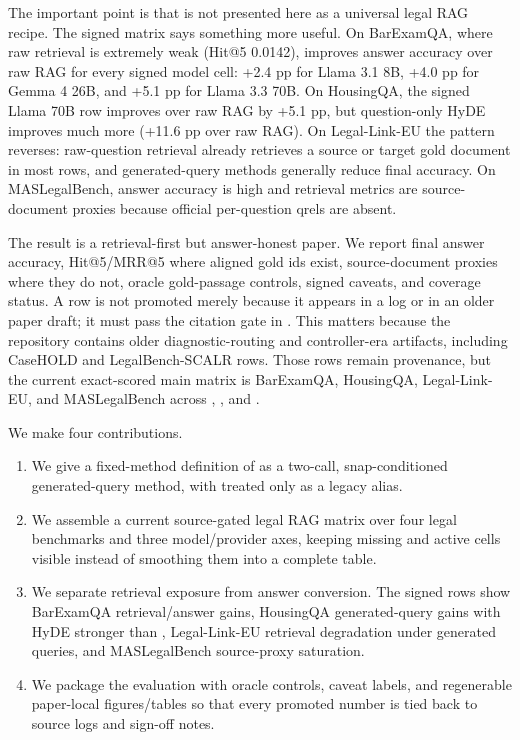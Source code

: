 The important point is that \hyre{} is not presented here as a universal legal
RAG recipe. The signed matrix says something more useful. On BarExamQA, where
raw retrieval is extremely weak (Hit@5 0.0142), \hyre{} improves answer
accuracy over raw RAG for every signed model cell: +2.4 pp for Llama 3.1 8B,
+4.0 pp for Gemma 4 26B, and +5.1 pp for Llama 3.3 70B. On HousingQA, the
signed Llama 70B \hyre{} row improves over raw RAG by +5.1 pp, but
question-only HyDE improves much more (+11.6 pp over raw RAG). On Legal-Link-EU
the pattern reverses: raw-question retrieval already retrieves a source or
target gold document in most rows, and generated-query methods generally reduce
final accuracy. On MASLegalBench, answer accuracy is high and retrieval metrics
are source-document proxies because official per-question qrels are absent.

The result is a retrieval-first but answer-honest paper. We report final answer
accuracy, Hit@5/MRR@5 where aligned gold ids exist, source-document proxies
where they do not, oracle gold-passage controls, signed caveats, and coverage
status. A row is not promoted merely because it appears in a log or in an older
paper draft; it must pass the citation gate in \claimgate. This matters because
the repository contains older diagnostic-routing and controller-era artifacts,
including CaseHOLD and LegalBench-SCALR rows. Those rows remain provenance, but
the current exact-scored main matrix is BarExamQA, HousingQA, Legal-Link-EU,
and MASLegalBench across , , and
.

We make four contributions.

\begin{enumerate}[leftmargin=*]
\item We give a fixed-method definition of \hyre{} as a two-call,
snap-conditioned generated-query method, with 
treated only as a legacy alias.
\item We assemble a current source-gated legal RAG matrix over four legal
benchmarks and three model/provider axes, keeping missing and active cells
visible instead of smoothing them into a complete table.
\item We separate retrieval exposure from answer conversion. The signed rows
show BarExamQA retrieval/answer gains, HousingQA generated-query gains with
HyDE stronger than \hyre{}, Legal-Link-EU retrieval degradation under generated
queries, and MASLegalBench source-proxy saturation.
\item We package the evaluation with oracle controls, caveat labels, and
regenerable paper-local figures/tables so that every promoted number is tied
back to source logs and sign-off notes.
\end{enumerate}

